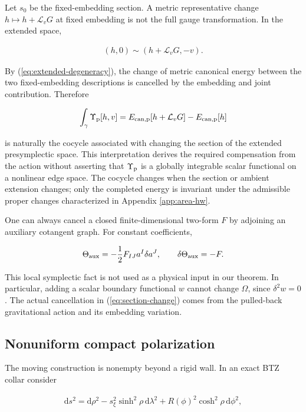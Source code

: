 Let $s_0$ be the fixed-embedding section. A metric representative change $h\mapsto h+\mathcal L_vG$ at fixed embedding is not the full gauge transformation. In the extended space,

\begin{align}
(h,0)\sim(h+\mathcal L_vG,-v). \label{eq:section-change}
\end{align}

By (\ref{eq:extended-degeneracy}), the change of metric canonical energy between the two fixed-embedding descriptions is cancelled by the embedding and joint contribution. Therefore

\begin{align}
\int_\gamma\Upsilon_{\rm p}[h,v]
=E_{{\rm can,p}}[h+\mathcal L_vG]
-E_{{\rm can,p}}[h]
\end{align}

is naturally the cocycle associated with changing the section of the extended presymplectic space. This interpretation derives the required compensation from the action without asserting that $\Upsilon_{\rm p}$ is a globally integrable scalar functional on a nonlinear edge space. The cocycle changes when the section or ambient extension changes; only the completed energy is invariant under the admissible proper changes characterized in Appendix \ref{app:area-hw}.

One can always cancel a closed finite-dimensional two-form $F$ by adjoining an auxiliary cotangent graph. For constant coefficients,

\begin{align}
\Theta_{\rm aux}=-\frac12F_{IJ}a^I\delta a^J,
\qquad
\delta\Theta_{\rm aux}=-F.
\end{align}

This local symplectic fact is not used as a physical input in our theorem. In particular, adding a scalar boundary functional $w$ cannot change $\Omega$, since $\delta^2w=0$. The actual cancellation in (\ref{eq:section-change}) comes from the pulled-back gravitational action and its embedding variation.

\subsection{Nonuniform compact polarization}\label{subsec:compact-polarization}

The moving construction is nonempty beyond a rigid wall. In an exact BTZ collar consider

\begin{align}
\mathrm ds^2
=\mathrm d\rho^2-s_\xi^2\sinh^2\rho\,\mathrm d\lambda^2
+R(\phi)^2\cosh^2\rho\,\mathrm d\phi^2,
\end{align}

